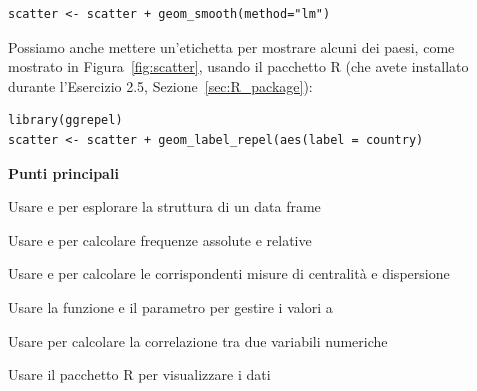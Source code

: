 \begin{lstlisting}[style=Rstylescript]
scatter <- scatter + geom_smooth(method="lm")
\end{lstlisting}
%
Possiamo anche mettere un'etichetta per mostrare alcuni dei paesi, come mostrato in Figura~\ref{fig:scatter}, usando il pacchetto R  (che avete installato durante l'Esercizio 2.5, Sezione~\ref{sec:R_package}):

\begin{lstlisting}[style=Rstylescript]
library(ggrepel)
scatter <- scatter + geom_label_repel(aes(label = country)
\end{lstlisting}




\vspace{0.5cm}

\begin{tcolorbox}[width=1\linewidth, halign=left, colframe=blue!60, colback=white, boxsep=1mm, arc=3mm]

\textbf{Punti principali}

\begin{myitemize}
    \item Usare  e  per esplorare la struttura di un data frame 
    \item Usare  e  per calcolare frequenze assolute e relative
	\item Usare  e  per calcolare le corrispondenti misure di centralit\`a e dispersione
    \item Usare la funzione  e il parametro  per gestire i valori a 
    \item Usare  per calcolare la correlazione tra due variabili numeriche
    \item Usare il pacchetto R  per visualizzare i dati
\end{myitemize}

\end{tcolorbox}
